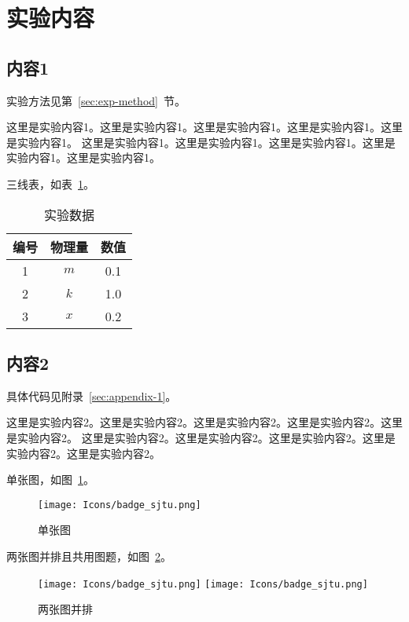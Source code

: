 \section{实验内容}

\subsection{内容1}

实验方法见第~\ref{sec:exp-method}~节。

这里是实验内容1。这里是实验内容1。这里是实验内容1。这里是实验内容1。这里是实验内容1。
这里是实验内容1。这里是实验内容1。这里是实验内容1。这里是实验内容1。这里是实验内容1。

三线表，如表~\ref{tab:exp-data}。

\begin{longtable}[c]{ccc}
    \caption{实验数据}
    \label{tab:exp-data} \\
    \toprule
    \textbf{编号} & \textbf{物理量} & \textbf{数值} \\
    \midrule
    \endhead
    1 & $m$ & 0.1 \\
    2 & $k$ & 1.0 \\
    3 & $x$ & 0.2 \\
    \bottomrule
\end{longtable}



\subsection{内容2}

具体代码见附录~\ref{sec:appendix-1}。

这里是实验内容2。这里是实验内容2。这里是实验内容2。这里是实验内容2。这里是实验内容2。
这里是实验内容2。这里是实验内容2。这里是实验内容2。这里是实验内容2。这里是实验内容2。

单张图，如图~\ref{fig:single-figure}。
\begin{figure}[!htp]
    \centering
    \texttt{[image: Icons/badge\_sjtu.png]}
    \caption{单张图}
    \label{fig:single-figure}
\end{figure}


两张图并排且共用图题，如图~\ref{fig:two-figures}。
\begin{figure}[!htp]
    \centering
    \texttt{[image: Icons/badge\_sjtu.png]}
    \hspace{1cm}
    \texttt{[image: Icons/badge\_sjtu.png]}
    \caption{两张图并排}
    \label{fig:two-figures}
\end{figure}


